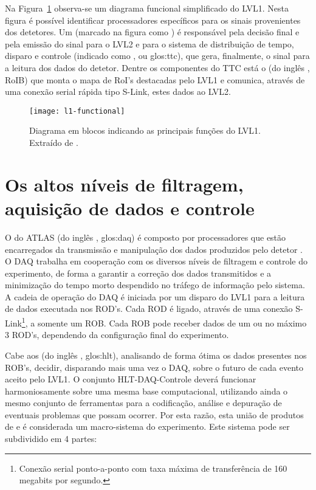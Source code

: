 Na Figura~\ref{fig:l1-functional} observa-se um diagrama funcional
simplificado do LVL1. Nesta figura é possível identificar processadores
específicos para os sinais provenientes dos detetores. Um  (marcado na figura como )
é responsável pela decisão final e pela emissão do sinal para o LVL2 e para o
sistema de distribuição de tempo, disparo e controle (indicado como
, ou \gls{glos:ttc}), que gera,
finalmente, o sinal para a leitura dos dados do detetor. Dentre os componentes
do TTC está o  (do inglês , RoIB)
que monta o mapa de RoI's destacadas pelo LVL1 e comunica, através de uma
conexão serial rápida tipo S-Link, estes dados ao LVL2.

\begin{figure}
\begin{center}
\texttt{[image: l1-functional]}
\end{center}
\caption[Diagrama em blocos indicando as principais funções do LVL1.]{Diagrama
em blocos indicando as principais funções do LVL1. Extraído de \cite{hlt-tdr}.}
\label{fig:l1-functional}
\end{figure}

\section{Os altos níveis de filtragem, aquisição de dados e controle}
\label{sec:hlt-daq}


O  do ATLAS (do inglês , \gls{glos:daq}) é composto por processadores que estão
encarregados da transmissão e manipulação dos dados produzidos pelo detetor
\cite{hlt-tdr}. O DAQ trabalha em cooperação com os diversos níveis de
filtragem e controle do experimento, de forma a garantir a correção dos dados
transmitidos e a minimização do tempo morto despendido no tráfego de
informação pelo sistema. A cadeia de operação do DAQ é iniciada por um disparo
do LVL1 para a leitura de dados executada nos ROD's. Cada ROD é ligado,
através de uma conexão S-Link\footnote{Conexão serial ponto-a-ponto com taxa
máxima de transferência de 160 megabits por segundo.}, a somente um ROB. Cada
ROB pode receber dados de um ou no máximo 3 ROD's, dependendo da configuração
final do experimento.

Cabe aos  (do inglês , \gls{glos:hlt}), analisando de forma ótima os dados presentes nos
ROB's, decidir, disparando mais uma vez o DAQ, sobre o futuro de cada evento
aceito pelo LVL1. O conjunto HLT-DAQ-Controle deverá funcionar harmoniosamente
sobre uma mesma base computacional, utilizando ainda o mesmo conjunto de
ferramentas para a codificação, análise e depuração de eventuais problemas que
possam ocorrer. Por esta razão, esta união de produtos de  e
 é considerada um macro-sistema do experimento. Este sistema
pode ser subdividido em 4 partes:

